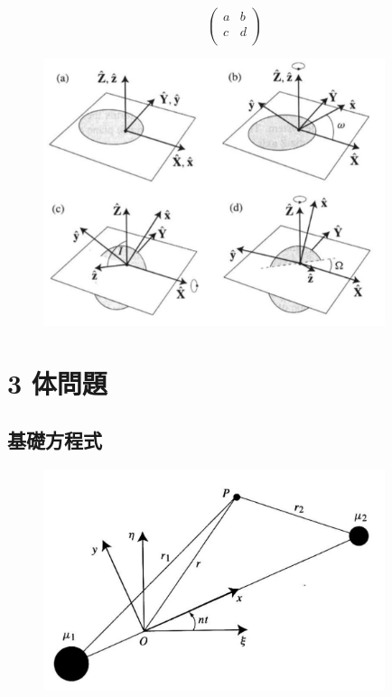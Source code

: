 \documentclass[11pt,a4paper,oneside,onecolumn]{jarticle}
\begin{document}
\begin{equation}
\begin{pmatrix}
a & b \\
c & d \\
\end{pmatrix}
\end{equation}

\begin{figure}[H]
\centering
\includegraphics[width=10cm]{./image/sec2_14.pdf}
\caption{\label{}}
\end{figure}




\section{3 体問題}
\subsection{基礎方程式}

\begin{figure}[H]
\centering
\includegraphics[width=10cm]{./image/sec3_1.pdf}
\caption{\label{}}
\end{figure}
\end{document}
